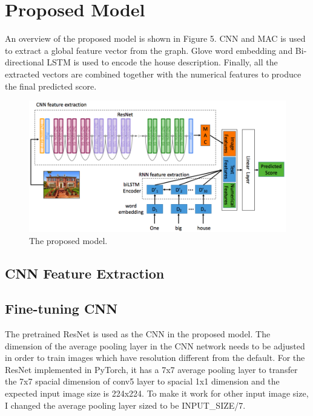 \documentclass{article} %
\begin{document}
\section{Proposed Model}

An overview of the proposed model is shown in Figure 5.
CNN and MAC is used to extract a global feature vector from the graph.
Glove word embedding and Bi-directional LSTM is used to encode the house description.
Finally, all the extracted vectors are combined together with
the numerical features to produce the final predicted score.

\begin{figure}[h]
	\begin{center}
		\includegraphics[width=1.0\linewidth]{fig/model.png}
	\end{center}
	\caption{The proposed model.}
\end{figure}

\subsection{CNN Feature Extraction}

\subsection{Fine-tuning CNN}

The pretrained ResNet\cite{he2016deep} is used as the CNN in the proposed model.
The dimension of the average pooling layer in the CNN network needs to be adjusted
in order to train images which have resolution different from the default.
For the ResNet implemented in PyTorch, it has a 7x7 average pooling layer
to transfer the 7x7 spacial dimension of conv5 layer to spacial 1x1 dimension
and the expected input image size is 224x224.
To make it work for other input image size, I changed the average pooling layer sized to be INPUT\_SIZE/7.
\end{document}
